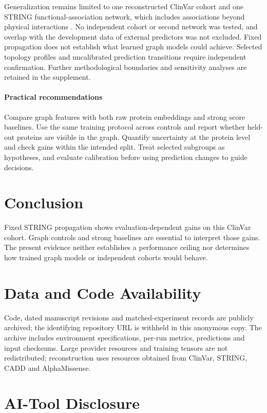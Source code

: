 \documentclass[conference]{IEEEtran}
\begin{document}
Generalization remains limited to one reconstructed ClinVar cohort and one STRING functional-association network, which includes associations beyond physical interactions \cite{Szklarczyk2023STRING}. No independent cohort or second network was tested, and overlap with the development data of external predictors was not excluded. Fixed propagation does not establish what learned graph models could achieve. Selected topology profiles and uncalibrated prediction transitions require independent confirmation. Further methodological boundaries and sensitivity analyses are retained in the supplement.

\paragraph{Practical recommendations}
Compare graph features with both raw protein embeddings and strong score baselines. Use the same training protocol across controls and report whether held-out proteins are visible in the graph. Quantify uncertainty at the protein level and check gains within the intended split. Treat selected subgroups as hypotheses, and evaluate calibration before using prediction changes to guide decisions.

\section{Conclusion}
Fixed STRING propagation shows evaluation-dependent gains on this ClinVar cohort. Graph controls and strong baselines are essential to interpret those gains. The present evidence neither establishes a performance ceiling nor determines how trained graph models or independent cohorts would behave.

\section*{Data and Code Availability}

Code, dated manuscript revisions and matched-experiment records are publicly archived; the identifying repository URL is withheld in this anonymous copy. The archive includes environment specifications, per-run metrics, predictions and input checksums. Large provider resources and training tensors are not redistributed; reconstruction uses resources obtained from ClinVar, STRING, CADD and AlphaMissense.

\section*{AI-Tool Disclosure}
\end{document}

